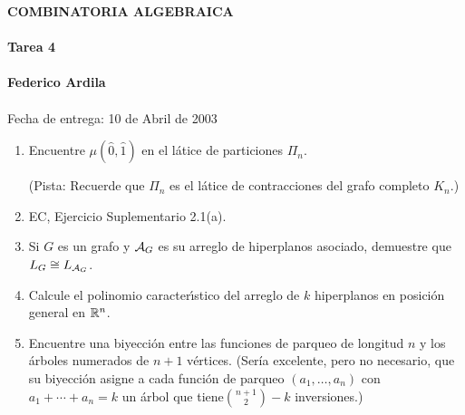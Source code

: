 \documentclass[letterpaper,10pt]{article}
\begin{document}
\begin{center}
{\bf {\LARGE{COMBINATORIA ALGEBRAICA}}}\\
\
\\ {\bf{\Large Tarea 4}}\\ \ \\
{\bf{\large{Federico Ardila}}}\\ \ \\ {\large Fecha de entrega: 10 de Abril de 2003 }\\[.25in]
\end{center}


\large


\smallskip

\begin{center}
\end{center}


\begin{enumerate}

\item Encuentre $\mu(\hat{0}, \hat{1})$ en el l{\'a}tice de
particiones $\Pi_n$.

(Pista: Recuerde que $\Pi_n$ es el l{\'a}tice de contracciones del
grafo completo $K_n$.)

\item EC, Ejercicio Suplementario 2.1(a).

\item Si $G$ es un grafo y ${\cal A}_G$ es su arreglo de
hiperplanos asociado, demuestre que $L_G \cong L_{{\cal A}_G}$.

\item Calcule el polinomio caracter{\'\i}stico del arreglo de $k$
hiperplanos en posici{\'o}n general en $\Bbb R^n$.

\item Encuentre una biyecci{\'o}n entre las funciones de parqueo
de longitud $n$ y los {\'a}rboles numerados de $n+1$ v{\'e}rtices.
(Ser{\'i}a excelente, pero no necesario, que su biyecci{\'o}n
asigne a cada funci{\'o}n de parqueo $(a_1, \ldots, a_n)$ con $a_1
+ \cdots + a_n = k$ un {\'a}rbol que tiene${n+1 \choose 2} - k$
inversiones.)


\end{enumerate}

\end{document}
